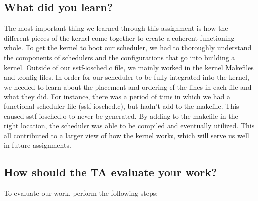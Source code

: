\documentclass[letterpaper,10pt,titlepage]{article}
\begin{document}
\subsection{What did you learn?}
The most important thing we learned through this assignment is how the different pieces of the kernel come together to create a coherent functioning whole.
To get the kernel to boot our scheduler, we had to thoroughly understand the components of schedulers and the configurations that go into building a kernel.
Outside of our sstf-iosched.c file, we mainly worked in the kernel Makefiles and .config files.
In order for our scheduler to be fully integrated into the kernel, we needed to learn about the placement and ordering of the lines in each file and what they did.
For instance, there was a period of time in which we had a functional scheduler file (sstf-iosched.c), but hadn't add to the makefile. 
This caused sstf-iosched.o to never be generated. 
By adding to the makefile in the right location, the scheduler was able to be compiled and eventually utilized.
This all contributed to a larger view of how the kernel works, which will serve us well in future assignments. 

\subsection{How should the TA evaluate your work?}
To evaluate our work, perform the following steps;
\end{document}
